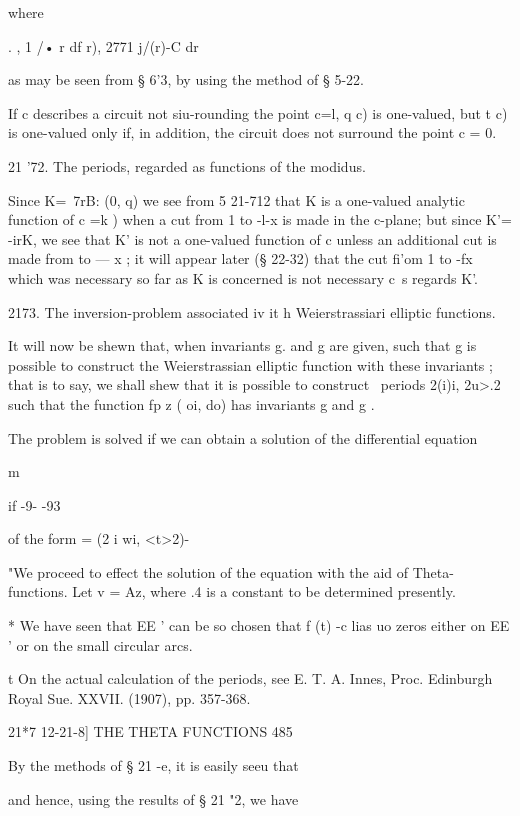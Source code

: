 where 

. , 1 /• r df r), 
2771 j/(r)-C dr 

as may be seen from § 6'3, by using the method of § 5-22. 

If c describes a circuit not siu-rounding the point c=l, q c) is one-valued, but t c) is 
one-valued only if, in addition, the circuit does not surround the point c = 0. 

21 '72. The periods, regarded as functions of the modidus. 

Since K=\ 7rB:  (0, q) we see from 5  21-712 that K is a one-valued analytic function of 
c =k ) when a cut from 1 to -l-x is made in the c-plane; but since K'= -irK, we see 
that K' is not a one-valued function of c unless an additional cut is made from to — x ; 
it will appear later (§ 22-32) that the cut fi'om 1 to -fx which was necessary so far as 
K is concerned is not necessary c\ s regards K'. 

2173. The inversion-problem associated iv it h Weierstrassiari elliptic functions. 

It will now be shewn that, when invariants g.  and g  are given, such that g %
is possible to construct the Weierstrassian elliptic function with these invariants ; that is 
to say, we shall shew that it is possible to construct \ periods 2(i)i, 2u>.2 such that the function 
fp  z ( oi, do) has invariants g  and g . 

The problem is solved if we can obtain a solution of the differential equation 



m 



   if -9- -93 

of the form   =   (2 i wi, <t>2)- 

"We proceed to effect the solution of the equation with the aid of Theta-functions. 
Let v = Az, where .4 is a constant to be determined presently. 

* We have seen that EE ' can be so chosen that f (t) -c lias uo zeros either on EE ' or on 
the small circular arcs. 

t On the actual calculation of the periods, see E. T. A. Innes, Proc. Edinburgh Royal Sue. 
XXVII. (1907), pp. 357-368. 



21*7 12-21-8] THE THETA FUNCTIONS 485 

By the methods of § 21 -e, it is easily seeu that 

and hence, using the results of § 21 "2, we have 

